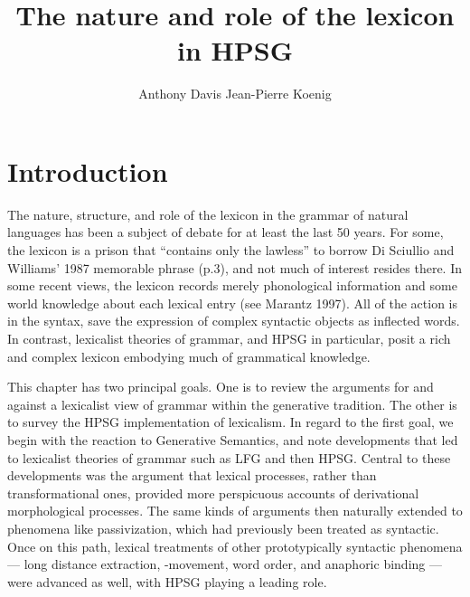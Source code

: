 \documentclass[output=paper]{langsci/langscibook}
\author{%
Anthony Davis\affiliation{Buffalo?}%
\lastand Jean-Pierre Koenig\affiliation{University at Buffalo}%
}
\title{The nature and role of the lexicon in HPSG}
\begin{document}

\section{Introduction}


The nature, structure, and role of the lexicon in the grammar of natural languages has been a subject of debate for at least the last 50 years. For some, the lexicon is a prison that ``contains only the lawless''  to borrow Di Sciullio and Williams' 1987 memorable phrase (p.3), and not much of interest resides there. In some recent views, the lexicon records merely phonological information and some world knowledge about each lexical entry (see Marantz 1997). All of the action is in the syntax, save the expression of complex syntactic objects as inflected words.
In contrast, lexicalist theories of grammar, and HPSG in particular, posit a rich and complex lexicon embodying much of grammatical knowledge.

This chapter has two principal goals.  One is to review the arguments for and against a lexicalist view of grammar within the generative tradition.  The other is to survey the HPSG implementation of lexicalism. In regard to the first goal, we begin with the reaction to Generative Semantics, and note developments that led to lexicalist theories of grammar such as LFG and then HPSG.  Central to these developments was the argument that lexical processes, rather than transformational ones, provided more perspicuous accounts of derivational morphological processes.  The same kinds of arguments then naturally extended to phenomena like passivization, which had previously been treated as syntactic.  Once on this path, lexical treatments of other prototypically syntactic phenomena — long distance extraction, -movement, word order, and anaphoric binding — were advanced as well, with HPSG playing a leading role.
\end{document}
